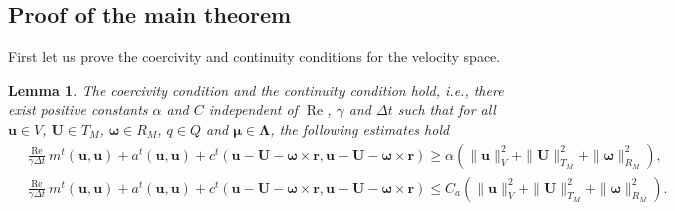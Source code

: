 \documentclass{article}
\newcommand{\bU}{{\mathbf{U}}}
\newcommand{\bu}{{\mathbf{u}}}
\newcommand{\bomega}{{\boldsymbol{\omega}}}
\newcommand{\Reynolds}{{\operatorname{Re}}}
\newtheorem{lemma}[theorem]{Lemma}
\begin{document}
\subsection{Proof of the main theorem}
First let us prove the coercivity and continuity conditions for the velocity space.
\begin{lemma}
    The coercivity condition and the continuity condition hold, i.e., there exist positive constants $\alpha$ and $C$ independent of $\Reynolds$, $\gamma$ and $\Delta t$ such that for all $\bu\in V$, $\bU\in T_M$, $\bomega\in R_M$, ${q}\in Q$ and ${\boldsymbol{\mu}}\in\boldsymbol{\Lambda}$, the following estimates hold
    \begin{equation}
        \begin{aligned}
            &\frac{\Reynolds}{\gamma\Delta t}{m}^t(\bu,\bu) + {a}^t(\bu,\bu) +  {c}^t(\bu-{\bU} - {\bomega}\times\mathbf{r},\bu-{\bU} - {\bomega}\times\mathbf{r})\geq \alpha (\|\bu\|^2_V  + \|\bU\|_{T_M}^2 + \|\bomega\|_{R_M}^2),\\
            &\frac{\Reynolds}{\gamma\Delta t}{m}^t(\bu,\bu) + {a}^t(\bu,\bu) +  {c}^t(\bu-{\bU} - {\bomega}\times\mathbf{r},\bu-{\bU} - {\bomega}\times\mathbf{r})\leq C_a (\|\bu\|^2_V  + \|\bU\|_{T_M}^2 + \|\bomega\|_{R_M}^2).
        \end{aligned}
    \end{equation}
\end{lemma}
\end{document}
